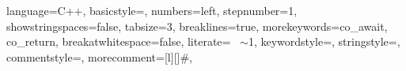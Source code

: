 


\lstset
{
    language=C++,
    basicstyle=\footnotesize,
    numbers=left,
    stepnumber=1,
    showstringspaces=false,
    tabsize=3,
    breaklines=true,
    morekeywords={co_await, co_return},
    breakatwhitespace=false,
    literate={~} {$\sim$}{1},
    keywordstyle=\color{blue},
    stringstyle=\color{red},
    commentstyle=\color{green},
    morecomment=[l][\color{magenta}]{\#},
}
